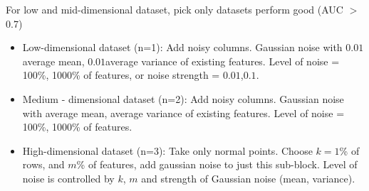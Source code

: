 For low and mid-dimensional dataset, pick only datasets perform good (AUC $>$ 0.7)
\begin{itemize}
\item{Low-dimensional dataset (n=1)}: Add noisy columns. Gaussian noise with $0.01$average mean, $0.01$average variance of existing features. Level of noise = 100\%, 1000\% of features, or noise strength = $0.01$,$0.1$.
\item{Medium - dimensional dataset (n=2)}: Add noisy columns. Gaussian noise with average mean, average variance of existing features. Level of noise = 100\%, 1000\% of features.
\item{High-dimensional dataset (n=3)}: Take only normal points. Choose $k=1$\% of rows, and $m$\% of features, add gaussian noise to just this sub-block. Level of noise is controlled by $k$, $m$ and strength of Gaussian noise (mean, variance).
\end{itemize}

